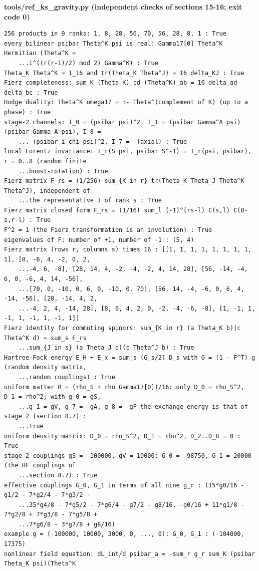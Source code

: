 \documentclass[10pt,a4paper]{article}
\begin{document}
\textbf{tools/ref\_ks\_gravity.py (independent checks of sections 15-16; exit code 0)}

\begin{Verbatim}[fontsize=\small,frame=single,framesep=2mm]
256 products in 9 ranks: 1, 8, 28, 56, 70, 56, 28, 8, 1 : True
every bilinear psibar Theta^K psi is real: Gamma17[0] Theta^K Hermitian (Theta^K =
    ...i^((r(r-1)/2) mod 2) Gamma^K) : True
Theta_K Theta^K = 1_16 and tr(Theta_K Theta^J) = 16 delta_KJ : True
Fierz completeness: sum_K (Theta_K)_cd (Theta^K)_ab = 16 delta_ad delta_bc : True
Hodge duality: Theta^K omega17 = +- Theta^(complement of K) (up to a phase) : True
stage-2 channels: I_0 = (psibar psi)^2, I_1 = (psibar Gamma^A psi)(psibar Gamma_A psi), I_8 =
    ...-(psibar i chi psi)^2, I_7 = -(axial) : True
local Lorentz invariance: I_r(S psi, psibar S^-1) = I_r(psi, psibar), r = 0..8 (random finite
    ...boost-rotation) : True
Fierz matrix F_rs = (1/256) sum_{K in r} tr(Theta_K Theta_J Theta^K Theta^J), independent of
    ...the representative J of rank s : True
Fierz matrix closed form F_rs = (1/16) sum_l (-1)^(rs-l) C(s,l) C(8-s,r-l) : True
F^2 = 1 (the Fierz transformation is an involution) : True
eigenvalues of F: number of +1, number of -1 : (5, 4)
Fierz matrix (rows r, columns s) times 16 : [[1, 1, 1, 1, 1, 1, 1, 1, 1], [8, -6, 4, -2, 0, 2,
    ...-4, 6, -8], [28, 14, 4, -2, -4, -2, 4, 14, 28], [56, -14, -4, 6, 0, -6, 4, 14, -56],
    ...[70, 0, -10, 0, 6, 0, -10, 0, 70], [56, 14, -4, -6, 0, 6, 4, -14, -56], [28, -14, 4, 2,
    ...-4, 2, 4, -14, 28], [8, 6, 4, 2, 0, -2, -4, -6, -8], [1, -1, 1, -1, 1, -1, 1, -1, 1]]
Fierz identity for commuting spinors: sum_{K in r} (a Theta_K b)(c Theta^K d) = sum_s F_rs
    ...sum_{J in s} (a Theta_J d)(c Theta^J b) : True
Hartree-Fock energy E_H + E_x = sum_s (G_s/2) D_s with G = (1 - F^T) g (random density matrix,
    ...random couplings) : True
uniform matter R = (rho_S + rho Gamma17[0])/16: only D_0 = rho_S^2, D_1 = rho^2; with g_0 = gS,
    ...g_1 = gV, g_7 = -gA, g_8 = -gP the exchange energy is that of stage 2 (section 8.7) :
    ...True
uniform density matrix: D_0 = rho_S^2, D_1 = rho^2, D_2..D_8 = 0 : True
stage-2 couplings gS = -100000, gV = 10000: G_0 = -98750, G_1 = 20000 (the HF couplings of
    ...section 8.7) : True
effective couplings G_0, G_1 in terms of all nine g_r : (15*g0/16 - g1/2 - 7*g2/4 - 7*g3/2 -
    ...35*g4/8 - 7*g5/2 - 7*g6/4 - g7/2 - g8/16, -g0/16 + 11*g1/8 - 7*g2/8 + 7*g3/8 - 7*g5/8 +
    ...7*g6/8 - 3*g7/8 + g8/16)
example g = (-100000, 10000, 3000, 0, ..., 0): G_0, G_1 : (-104000, 17375)
nonlinear field equation: dL_int/d psibar_a = -sum_r g_r sum_K (psibar Theta_K psi)(Theta^K

\end{Verbatim}
\end{document}
